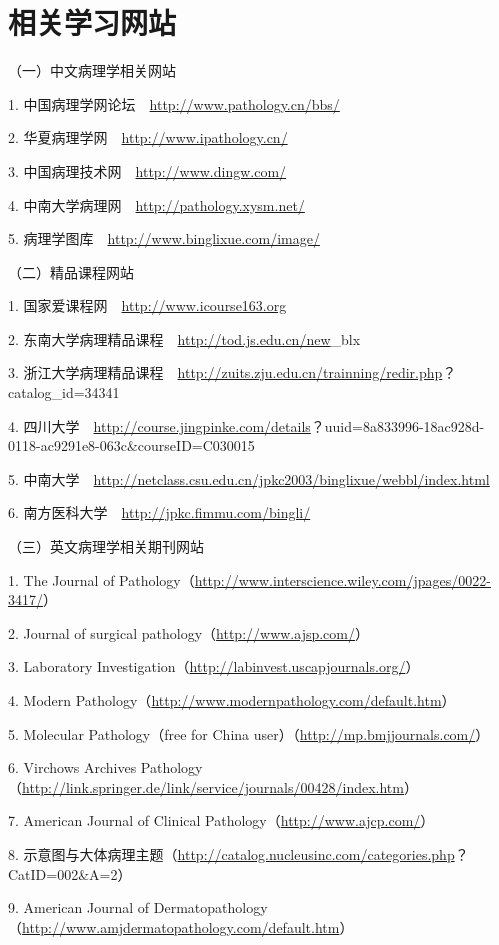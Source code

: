 \chapter{相关学习网站}

（一）中文病理学相关网站

1. 中国病理学网论坛　\url{http://www.pathology.cn/bbs/}

2. 华夏病理学网　\url{http://www.ipathology.cn/}

3. 中国病理技术网　\url{http://www.dingw.com/}

4. 中南大学病理网　\url{http://pathology.xysm.net/}

5. 病理学图库　\url{http://www.binglixue.com/image/}

（二）精品课程网站

1. 国家爱课程网　\url{http://www.icourse163.org}

2. 东南大学病理精品课程　\url{http://tod.js.edu.cn/new}\_blx

3.
浙江大学病理精品课程　\url{http://zuits.zju.edu.cn/trainning/redir.php}？catalog\_id=34341

4.
四川大学　\url{http://course.jingpinke.com/details}？uuid=8a833996-18ac928d-0118-ac9291e8-063c\&courseID=C030015

5.
中南大学　\url{http://netclass.csu.edu.cn/jpkc2003/binglixue/webbl/index.html}

6. 南方医科大学　\url{http://jpkc.fimmu.com/bingli/}

（三）英文病理学相关期刊网站

1. The Journal of
Pathology（\url{http://www.interscience.wiley.com/jpages/0022-3417/}）

2. Journal of surgical pathology（\url{http://www.ajsp.com/}）

3. Laboratory Investigation（\url{http://labinvest.uscapjournals.org/}）

4. Modern Pathology（\url{http://www.modernpathology.com/default.htm}）

5. Molecular Pathology（free for China
user）（\url{http://mp.bmjjournals.com/}）

6. Virchows Archives
Pathology（\url{http://link.springer.de/link/service/journals/00428/index.htm}）

7. American Journal of Clinical Pathology（\url{http://www.ajcp.com/}）

8.
示意图与大体病理主题（\url{http://catalog.nucleusinc.com/categories.php}？CatID=002\&A=2）

9. American Journal of
Dermatopathology（\url{http://www.amjdermatopathology.com/default.htm}）

